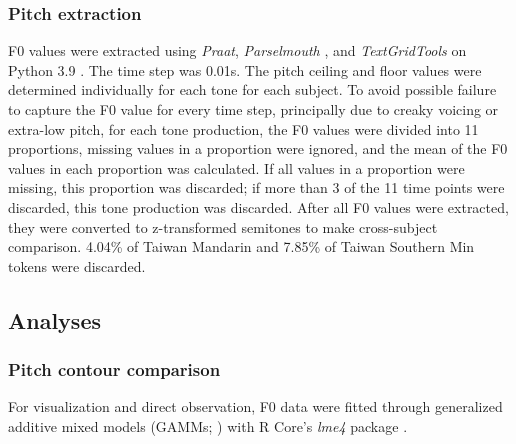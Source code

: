 \subsubsection{Pitch extraction}\label{section:PitchExtraction}
F0 values were extracted using \textit{Praat}, \textit{Parselmouth} \citep{Jadouletal2018}, and \textit{TextGridTools} \citep{BuschmeierWlodarczak2013} on Python 3.9 \citep{vanRossumDrake2009}. The time step was 0.01s. The pitch ceiling and floor values were determined individually for each tone for each subject. To avoid possible failure to capture the F0 value for every time step, principally due to creaky voicing or extra-low pitch, for each tone production, the F0 values were divided into 11 proportions, missing values in a proportion were ignored, and the mean of the F0 values in each proportion was calculated. If all values in a proportion were missing, this proportion was discarded; if more than 3 of the 11 time points were discarded, this tone production was discarded. After all F0 values were extracted, they were converted to z-transformed semitones to make cross-subject comparison. 4.04\% of Taiwan Mandarin and 7.85\% of Taiwan Southern Min tokens were discarded.

\subsection{Analyses}
\subsubsection{Pitch contour comparison}
For visualization and direct observation, F0 data were fitted through generalized additive mixed models (GAMMs; \citealp{Wieling2018}) with R Core’s \citep{RCoreTeam2019} \textit{lme4} package \citep{Batesetal2015}.

